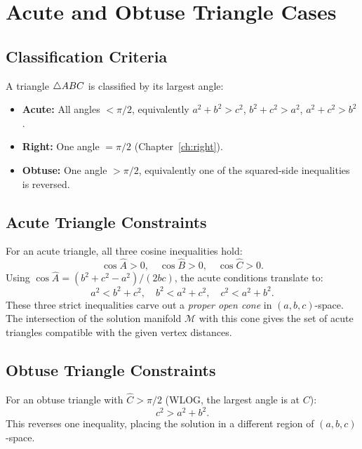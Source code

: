 \chapter{Acute and Obtuse Triangle Cases}
\label{ch:acute-obtuse}

\section{Classification Criteria}
A triangle $\triangle ABC$ is classified by its largest angle:
\begin{itemize}
    \item \textbf{Acute:} All angles $< \pi/2$, equivalently $a^2 + b^2 > c^2$, $b^2 + c^2 > a^2$, $a^2 + c^2 > b^2$.
    \item \textbf{Right:} One angle $= \pi/2$ (Chapter~\ref{ch:right}).
    \item \textbf{Obtuse:} One angle $> \pi/2$, equivalently one of the squared-side inequalities is reversed.
\end{itemize}

\section{Acute Triangle Constraints}
For an acute triangle, all three cosine inequalities hold:
\begin{equation}
\cos\hat{A} > 0, \quad \cos\hat{B} > 0, \quad \cos\hat{C} > 0.
\end{equation}
Using $\cos\hat{A} = (b^2 + c^2 - a^2)/(2bc)$, the acute conditions translate to:
\begin{equation}
a^2 < b^2 + c^2, \quad b^2 < a^2 + c^2, \quad c^2 < a^2 + b^2.
\end{equation}
These three strict inequalities carve out a \emph{proper open cone} in $(a, b, c)$-space. The intersection of the solution manifold $\mathcal{M}$ with this cone gives the set of acute triangles compatible with the given vertex distances.

\section{Obtuse Triangle Constraints}
For an obtuse triangle with $\hat{C} > \pi/2$ (WLOG, the largest angle is at $C$):
\begin{equation}
c^2 > a^2 + b^2.
\end{equation}
This reverses one inequality, placing the solution in a different region of $(a, b, c)$-space.

